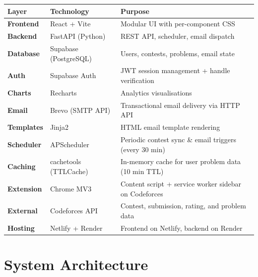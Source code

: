\documentclass[11pt, a4paper]{article}
\begin{document}
\begin{center}
\begin{tabularx}{0.97\linewidth}{>{\bfseries\color{accent}}l >{\ttfamily\color{accentgreen}}l X}
\toprule
\rowcolor{bgaccent}
\color{textsecondary}Layer    &\color{textsecondary}Technology &\color{textsecondary}Purpose \\
\midrule
Frontend  & React + Vite          & Modular UI with per-component CSS \\
Backend   & FastAPI (Python)      & REST API, scheduler, email dispatch \\
Database  & Supabase (PostgreSQL) & Users, contests, problems, email state \\
Auth      & Supabase Auth         & JWT session management + handle verification \\
Charts    & Recharts              & Analytics visualisations \\
Email     & Brevo (SMTP API)      & Transactional email delivery via HTTP API \\
Templates & Jinja2                & HTML email template rendering \\
Scheduler & APScheduler           & Periodic contest sync \& email triggers (every 30 min) \\
Caching   & cachetools (TTLCache) & In-memory cache for user problem data (10 min TTL) \\
Extension & Chrome MV3            & Content script + service worker sidebar on Codeforces \\
External  & Codeforces API        & Contest, submission, rating, and problem data \\
Hosting   & Netlify + Render      & Frontend on Netlify, backend on Render \\
\bottomrule
\end{tabularx}
\end{center}

\section{System Architecture}
\end{document}
